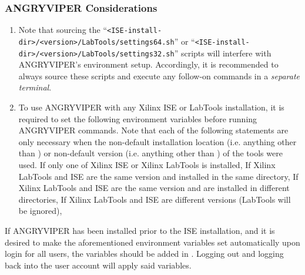 \begin{flushleft}
\begin{flushleft}
\subsubsection{ANGRYVIPER Considerations}
\label{sec:iseav}
\begin{enumerate}
\item Note that sourcing the ``\verb+<ISE-install-dir>/<version>/LabTools/settings64.sh+'' or ``\verb+<ISE-install-dir>/<version>/LabTools/settings32.sh+'' scripts will interfere with ANGRYVIPER's environment setup. Accordingly, it is recommended to always source these scripts and execute any follow-on commands in a \textit{separate terminal}.
\item To use ANGRYVIPER with any Xilinx ISE or LabTools installation,  it is required to set the following environment variables before running ANGRYVIPER commands. Note that each of the following  statements are only necessary when the non-default installation location (i.e. anything other than ) or non-default version (i.e. anything other than ) of the tools were used.
\subitem If only one of Xilinx ISE or Xilinx LabTools is installed,
\subsubitem {}
\subsubitem {}
\subitem If Xilinx LabTools and ISE are the same version and installed in the same directory,
\subsubitem {}
\subsubitem {}
\subitem If Xilinx LabTools and ISE are the same version and are installed in different directories,
\subsubitem {}
\subsubitem {}
\subsubitem {}
\subitem If Xilinx LabTools and ISE are different versions (LabTools will be ignored),
\subsubitem {}
\subsubitem {}
\end{enumerate}

If ANGRYVIPER has been installed prior to the ISE installation, and it is desired to make the aforementioned environment variables set automatically upon login for all users, the variables should be added in . Logging out and logging back into the user account will apply said variables.
\end{flushleft}


\end{flushleft}
